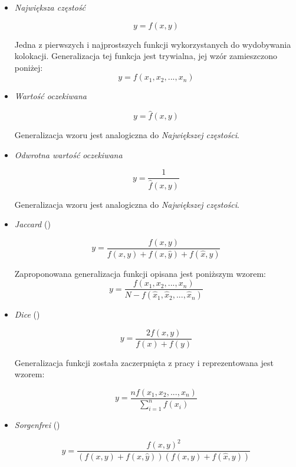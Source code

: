 \documentclass[11pt,a4paper]{llncs}
\begin{document}
\begin{itemize}
\setlength{\itemsep}{1pt}
  \setlength{\parskip}{1pt}
  \setlength{\parsep}{1pt}
	
	\item \emph{Największa częstość}

$$y = f(x, y)$$


Jedna z pierwszych i najprostszych funkcji wykorzystanych do wydobywania kolokacji.
Generalizacja tej funkcja jest trywialna, jej wzór zamieszczono poniżej:
$$ y = f(x_{1}, x_{2}, ..., x_{n}) $$


\item \emph{Wartość oczekiwana}

$$ y = \hat{f}(x, y) $$


Generalizacja wzoru jest analogiczna do \emph{Największej częstości}.


\item \emph{Odwrotna wartość oczekiwana}

$$ y = \frac{1}{\hat{f}(x, y)} $$


Generalizacja wzoru jest analogiczna do \emph{Największej częstości}.


\item \emph{Jaccard} (\cite[str. 18]{pecina_measures})

$$ y = \frac{f(x, y)}{f(x, y) + f(x, \hat{y}) + f(\hat{x}, y)} $$


Zaproponowana generalizacja funkcji opisana jest poniższym wzorem:
$$ y = \frac{f(x_{1}, x_{2}, ..., x_{n})}{N - f(\hat{x}_{1}, \hat{x}_{2}, ..., \hat{x}_{n})} $$


\item \emph{Dice} (\cite[str. 18]{pecina_measures})

$$ y = \frac{2f(x, y)}{f(x) + f(y)} $$

Generalizacja funkcji została zaczerpnięta z pracy \cite[str. 2]{generalization_patterns} i reprezentowana jest wzorem:
\begin{center}
$$ y = \frac{nf(x_{1}, x_{2}, ..., x_{n})}{\sum_{i = 1}^{n} f(x_{i})} $$
\end{center}


\item \emph{Sorgenfrei} (\cite[str. 4]{paradowski_beta})

\begin{center}
$$ y = \frac{f(x, y)^2}{(f(x, y) + f(x, \hat{y}))(f(x, y) + f(\hat{x}, y))} $$
\end{center}



\end{itemize}
\end{document}
